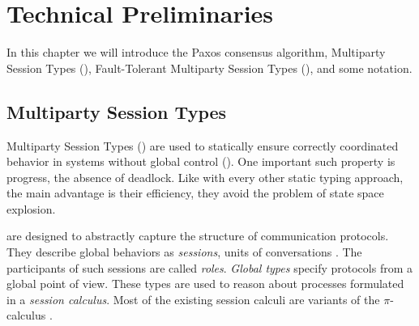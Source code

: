\chapter{Technical Preliminaries}
In this chapter we will introduce the Paxos consensus algorithm, Multiparty Session Types (\MPST), Fault-Tolerant Multiparty Session Types (\FTMPST), and some notation.


\section{Multiparty Session Types}
Multiparty Session Types (\MPST) are used to statically ensure correctly coordinated behavior in systems without global control (\cite{hondaYoshidaCarbone16,CoppoEtal15}).
One important such property is progress, \ie the absence of deadlock. Like with every other static typing approach, the main advantage is their efficiency, \ie they avoid the problem of state space explosion.

\MPST are designed to abstractly capture the structure of communication protocols.
They describe global behaviors as \emph{sessions}, \ie units of
conversations \cite{hondaYoshidaCarbone16,BettiniEtal08,BocciEtal10}. The participants of such sessions are called \emph{roles}.
\emph{Global types} specify protocols from a global point of view.
These types are used to reason about processes formulated
in a \emph{session calculus}. Most of the existing session calculi are
variants of the $ \pi $-calculus \cite{MilnerParrowWalker92}.




